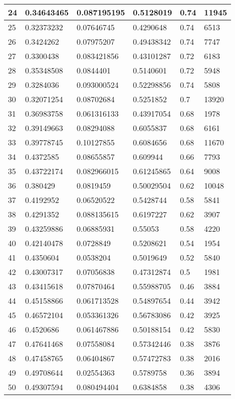 \begin{longtable}{|l|l|l|l|l|l|}
24 & 0.34643465 & 0.087195195 & 0.5128019 & 0.74 & 11945 \\ \hline 
25 & 0.32373232 & 0.07646745 & 0.4290648 & 0.74 & 6513 \\ \hline 
26 & 0.3424262 & 0.07975207 & 0.49438342 & 0.74 & 7747 \\ \hline 
27 & 0.3300438 & 0.083421856 & 0.43101287 & 0.72 & 6183 \\ \hline 
28 & 0.35348508 & 0.0844401 & 0.5140601 & 0.72 & 5948 \\ \hline 
29 & 0.3284036 & 0.093000524 & 0.52298856 & 0.74 & 5808 \\ \hline 
30 & 0.32071254 & 0.08702684 & 0.5251852 & 0.7 & 13920 \\ \hline 
31 & 0.36983758 & 0.061316133 & 0.43917054 & 0.68 & 1978 \\ \hline 
32 & 0.39149663 & 0.08294088 & 0.6055837 & 0.68 & 6161 \\ \hline 
33 & 0.39778745 & 0.10127855 & 0.6084656 & 0.68 & 11670 \\ \hline 
34 & 0.4372585 & 0.08655857 & 0.609944 & 0.66 & 7793 \\ \hline 
35 & 0.43722174 & 0.082966015 & 0.61245865 & 0.64 & 9008 \\ \hline 
36 & 0.380429 & 0.0819459 & 0.50029504 & 0.62 & 10048 \\ \hline 
37 & 0.4192952 & 0.06520522 & 0.5428744 & 0.58 & 5841 \\ \hline 
38 & 0.4291352 & 0.088135615 & 0.6197227 & 0.62 & 3907 \\ \hline 
39 & 0.43259886 & 0.06885931 & 0.55053 & 0.58 & 4220 \\ \hline 
40 & 0.42140478 & 0.0728849 & 0.5208621 & 0.54 & 1954 \\ \hline 
41 & 0.4350604 & 0.0538204 & 0.5019649 & 0.52 & 5840 \\ \hline 
42 & 0.43007317 & 0.07056838 & 0.47312874 & 0.5 & 1981 \\ \hline 
43 & 0.43415618 & 0.07870464 & 0.55988705 & 0.46 & 3884 \\ \hline 
44 & 0.45158866 & 0.061713528 & 0.54897654 & 0.44 & 3942 \\ \hline 
45 & 0.46572104 & 0.053361326 & 0.56783086 & 0.42 & 3925 \\ \hline 
46 & 0.4520686 & 0.061467886 & 0.50188154 & 0.42 & 5830 \\ \hline 
47 & 0.47641468 & 0.07558084 & 0.57342446 & 0.38 & 3876 \\ \hline 
48 & 0.47458765 & 0.06404867 & 0.57472783 & 0.38 & 2016 \\ \hline 
49 & 0.49708644 & 0.02554363 & 0.5789758 & 0.36 & 3894 \\ \hline 
50 & 0.49307594 & 0.080494404 & 0.6384858 & 0.38 & 4306 \\ \hline 
\end{longtable}